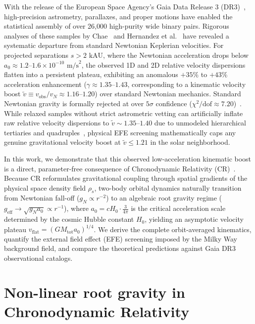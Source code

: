\documentclass[aps,prd,reprint,superscriptaddress,nofootinbib,floatfix,amsmath,amssymb]{revtex4-2}
\begin{document}
With the release of the European Space Agency's Gaia Data Release 3 (DR3)~\cite{gaia2023dr3}, high-precision astrometry, parallaxes, and proper motions have enabled the statistical assembly of over 26,000 high-purity wide binary pairs. Rigorous analyses of these samples by Chae~\cite{chae2023breakdown,chae2024robust} and Hernandez et al.~\cite{hernandez2023internal} have revealed a systematic departure from standard Newtonian Keplerian velocities. For projected separations $s > 2\text{ kAU}$, where the Newtonian acceleration drops below $a_0 \approx 1.2\text{--}1.6 \times 10^{-10}\text{ m/s}^2$, the observed 1D and 2D relative velocity dispersions flatten into a persistent plateau, exhibiting an anomalous $+35\%$ to $+43\%$ acceleration enhancement ($\gamma \approx 1.35\text{--}1.43$, corresponding to a kinematic velocity boost $\tilde{v} \equiv v_{\text{obs}}/v_N \approx 1.16\text{--}1.20$) over standard Newtonian mechanics. Standard Newtonian gravity is formally rejected at over $5\sigma$ confidence ($\chi^2/\text{dof} \approx 7.20$)~\cite{chae2023breakdown}. While relaxed samples without strict astrometric vetting can artificially inflate raw relative velocity dispersions to $\tilde{v} \sim 1.35\text{--}1.40$ due to unmodeled hierarchical tertiaries and quadruples~\cite{pittordis2023testing,banik2024strong}, physical EFE screening mathematically caps any genuine gravitational velocity boost at $\tilde{v} \le 1.21$ in the solar neighborhood.

In this work, we demonstrate that this observed low-acceleration kinematic boost is a direct, parameter-free consequence of Chronodynamic Relativity (CR)~\cite{shreve2026foundations,shreve2026temporal}. Because CR reformulates gravitational coupling through spatial gradients of the physical space density field $\rho_s$, two-body orbital dynamics naturally transition from Newtonian fall-off ($g_N \propto r^{-2}$) to an algebraic root gravity regime ($g_{\text{eff}} \to \sqrt{g_N a_0} \propto r^{-1}$), where $a_0 = c H_0 \cdot \frac{3}{4\pi}$ is the critical acceleration scale determined by the cosmic Hubble constant $H_0$, yielding an asymptotic velocity plateau $v_{\text{flat}} = (G M_{\text{tot}} a_0)^{1/4}$. We derive the complete orbit-averaged kinematics, quantify the external field effect (EFE) screening imposed by the Milky Way background field, and compare the theoretical predictions against Gaia DR3 observational catalogs.

\section{Non-linear root gravity in Chronodynamic Relativity}
\label{sec:theory}
\end{document}
